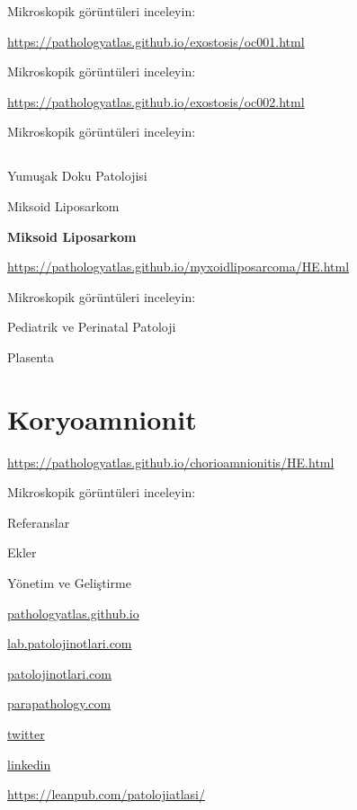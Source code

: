 \documentclass[
  letterpaper,
  DIV=11,
  numbers=noendperiod]{scrreprt}
\newlength{\cslhangindent}
\newlength{\cslentryspacingunit} %
\newenvironment{CSLReferences}[2] %
 {%
  \setlength{\parindent}{0pt}
  \ifodd #1
  \let\oldpar\par
  \def\par{\hangindent=\cslhangindent\oldpar}
  \fi
  \setlength{\parskip}{#2\cslentryspacingunit}
 }%
 {}
\begin{document}
Mikroskopik görüntüleri inceleyin:

\url{https://pathologyatlas.github.io/exostosis/oc001.html}

Mikroskopik görüntüleri inceleyin:

\url{https://pathologyatlas.github.io/exostosis/oc002.html}

Mikroskopik görüntüleri inceleyin:

\hypertarget{section}{%
\section{}\label{section}}

Yumuşak Doku Patolojisi

Miksoid Liposarkom

\textbf{Miksoid Liposarkom}

\url{https://pathologyatlas.github.io/myxoidliposarcoma/HE.html}

Mikroskopik görüntüleri inceleyin:

Pediatrik ve Perinatal Patoloji

Plasenta

\hypertarget{koryoamnionit}{%
\chapter{Koryoamnionit}\label{koryoamnionit}}

\url{https://pathologyatlas.github.io/chorioamnionitis/HE.html}

Mikroskopik görüntüleri inceleyin:

Referanslar

\hypertarget{refs}{}
\begin{CSLReferences}{0}{0}
\end{CSLReferences}

Ekler

Yönetim ve Geliştirme

\href{https://pathologyatlas.github.io/}{pathologyatlas.github.io}

\href{https://lab.patolojinotlari.com}{lab.patolojinotlari.com}

\href{https://patolojinotlari.com}{patolojinotlari.com}

\href{https://parapathology.com}{parapathology.com}

\href{https://twitter.com/patolojinotlari}{twitter}

\href{https://www.linkedin.com/company/patoloji-notlari}{linkedin}

\url{https://leanpub.com/patolojiatlasi/}
\end{document}
